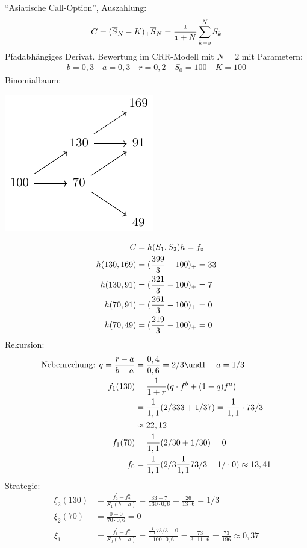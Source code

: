\begin{*example}
	``Asiatische Call-Option'', Auszahlung:
	\begin{align*}
		C=(\overline{S}_N - K)_+ \mit \overline{S}_N = \frac{1}{1+N}\sum_{k=0}^N S_k
	\end{align*}
	Pfadabhängiges Derivat. Bewertung im CRR-Modell mit $N=2$ mit Parametern:
	\begin{align*}
		b=0,3\quad a=0,3 \quad r = 0,2\quad S_0 = 100\quad K = 100
	\end{align*}
	Binomialbaum:
	\begin{center}
	\includegraphics[width=.5\textwidth]{tikz/stochv_2_3.pdf}
\end{center}
	\begin{align*}
		C&=h(S_1,S_2) \mit h = f_2\\
		h(130,169) &= (\frac{399}{3}-100)_+ = 33\\
		h(130,91) &= (\frac{321}{3}-100)_+ = 7\\
		h(70,91) &= (\frac{261}{3}-100)_+ = 0\\
		h(70,49) &= (\frac{219}{3}-100)_+ = 0
	\end{align*}
	Rekursion:\\
	\begin{align*}
		\text{Nebenrechung: }q = \frac{r-a}{b-a} &= \frac{0,4}{0,6} = 2/3 \und 1-a = 1/3\\
		f_1(130) &= \frac{1}{1+r}(q \cdot f^b + (1-q)f^a)\\
		&= \frac{1}{1,1}(2/3 33 + 1/3 7) = \frac{1}{1,1}\cdot 73/3\\
		&\approx 22,12\\
		f_1(70) &= \frac{1}{1,1}(2/3 0 + 1/3 0) = 0\\
		f_0 &= \frac{1}{1,1}(2/3 \frac{1}{1,1} 73/3 + 1/\cdot 0) \approx 13,41
	\end{align*}
	Strategie:
	\begin{align*}
		\xi_2(130) &= \frac{f_2^b - f_2^a}{S_1 (b-a)} = \frac{33-7}{130\cdot 0,6} = \frac{26}{13\cdot 6} = 1/3\\
		\xi_2(70) &= \frac{0-0}{70\cdot 0,6} = 0\\
		\xi_1 &= \frac{f_1^b - f_1^a}{S_0(b-a)} = \frac{\frac{1}{1,1}73/3 - 0}{100\cdot 0,6} = \frac{73}{3\cdot 11 \cdot 6} = \frac{73}{196} \approx 0,37 
	\end{align*}
\end{*example}
